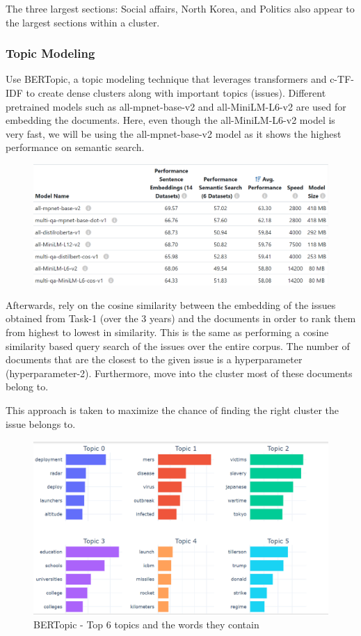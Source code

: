 \documentclass[sigconf,authorversion,nonacm]{acmart}
\begin{document}
The three largest sections: Social affairs, North Korea, and Politics also appear to the largest sections within a cluster.

\subsubsection{Topic Modeling}
Use BERTopic, a topic modeling technique that leverages transformers and c-TF-IDF to create dense clusters along with important topics (issues). Different pretrained models such as all-mpnet-base-v2 and all-MiniLM-L6-v2 are used for embedding the documents. Here, even though the all-MiniLM-L6-v2 model is very fast, we will be using the all-mpnet-base-v2 model as it shows the highest performance on semantic search.

\begin{figure}[ht]
    \includegraphics[width=\linewidth]{img/image9.png} 
    \caption{\protect\footnotemark}
\end{figure}


Afterwards, rely on the cosine similarity between the embedding of the issues obtained from Task-1 (over the 3 years) and the documents in order to rank them from highest to lowest in similarity. This is the same as performing a cosine similarity based query search of the issues over the entire corpus. The number of documents that are the closest to the given issue is a hyperparameter (hyperparameter-2). Furthermore, move into the cluster most of these documents belong to.

This approach is taken to maximize the chance of finding the right cluster the issue belongs to.

\begin{figure}[ht]
    \includegraphics[width=\linewidth]{img/image10.png} 
    \caption{BERTopic - Top 6 topics and the words they contain}
\end{figure}
\end{document}
